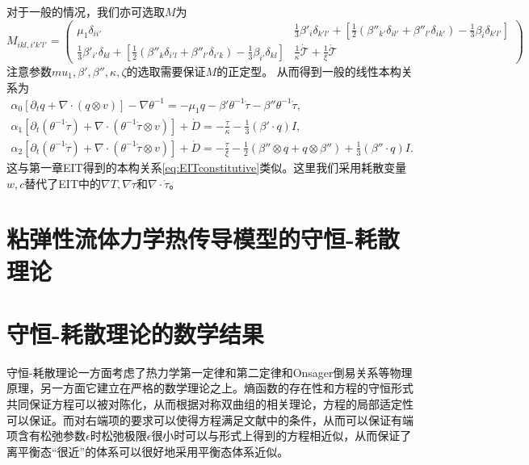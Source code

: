 \documentclass{article}
\begin{document}
	对于一般的情况，我们亦可选取$M$为
	\begin{equation*}
		M_{ikl,i'k'l'} = \left( \begin{array}{ccc} 
			\mu_1 \delta_{ii' } & \frac{1}{3}\beta'_i \delta_{k'l'} +  [\frac{1}{2} (\beta''_{k'} \delta_{il'} + \beta''_{l'} \delta_{ik'}) - \frac{1}{3} \beta_{i} \delta_{k'l'}]\\
			\frac{1}{3}\beta'_{i'} \delta_{kl} +  [\frac{1}{2} (\beta''_{k} \delta_{i'l} + \beta''_{l'} \delta_{i'k}) - \frac{1}{3} \beta_{i'} \delta_{kl}] &  \frac{1}{\kappa} \dot{\mathcal{T}} + \frac{1}{\xi} \mathring{\mathcal{T}}  
		\end{array} \right)
	\end{equation*} 
	注意参数$mu_1,\beta',\beta'',\kappa,\zeta$的选取需要保证$M$的正定型。
	从而得到一般的线性本构关系为
	\begin{subequations}
		\begin{align*}
			\alpha_0 [\partial_t q +  \nabla \cdot (q \otimes v)] - \nabla \theta^{-1} = - \mu_1 q -\beta' \theta^{-1} \dot{\tau} - \beta'' \theta^{-1} \mathring{\tau} , \\
			\alpha_1[\partial_t (\theta^{-1} \dot{\tau}) + \nabla \cdot (\theta^{-1} \dot{\tau} \otimes v)] + \dot{D} = -\frac{\dot{\tau}}{\kappa} - \frac{1}{3}(\beta' \cdot q) I, \\
			\alpha_2[\partial_t (\theta^{-1} \mathring{\tau}) + \nabla \cdot (\theta^{-1} \mathring{\tau} \otimes v)] + \mathring{D} = -\frac{\dot{\tau}}{\xi} - \frac{1}{2} (\beta''  \otimes q + q \otimes \beta'') + \frac{1}{3}(\beta'' \cdot q) I. 
		\end{align*}
	\end{subequations}
	这与第一章EIT得到的本构关系\eqref{eq:EITconstitutive}类似。这里我们采用耗散变量$w,c$替代了EIT中的$\nabla T, \nabla \dot{\tau}$和$\nabla \cdot{\mathring{\tau}}$。

	\section{粘弹性流体力学热传导模型的守恒-耗散理论}

	\section{守恒-耗散理论的数学结果}
	守恒-耗散理论一方面考虑了热力学第一定律和第二定律和Onsager倒易关系等物理原理，另一方面它建立在严格的数学理论之上。熵函数的存在性和方程的守恒形式共同保证方程可以被对陈化，从而根据对称双曲组的相关理论，方程的局部适定性可以保证。而对右端项的要求可以使得方程满足文献\cite{}中的条件，从而可以保证有端项含有松弛参数$\epsilon$时松弛极限$\epsilon$很小时可以与形式上得到的方程相近似，从而保证了离平衡态“很近”的体系可以很好地采用平衡态体系近似。
\end{document}
